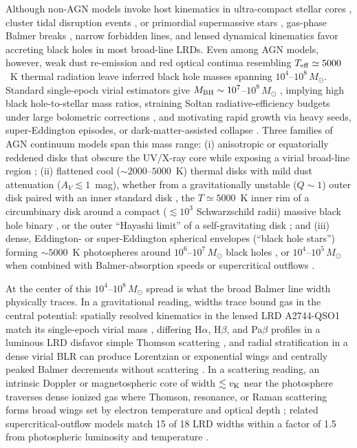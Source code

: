 \documentclass[twocolumn,linenumbers]{aastex701}
\newcommand{\Ha}{H$\alpha$}
\newcommand{\Hb}{H$\beta$}
\newcommand{\Teff}{T_{\rm eff}}
\newcommand{\vK}{v_{\rm K}}
\providecommand{\Msun}{M_\odot}
\begin{document}
Although non-AGN models invoke host kinematics in ultra-compact stellar cores \citep{Baggen2024}, cluster tidal disruption events \citep{Bellovary2025}, or primordial supermassive stars \citep{NandalLoeb2026}, gas-phase Balmer breaks \citep{deGraaffRuby2025,NaiduBHStar2026}, narrow forbidden lines, and lensed dynamical kinematics \citep{Juodzbalis2026} favor accreting black holes in most broad-line LRDs.
Even among AGN models, however, weak dust re-emission and red optical continua resembling $\Teff\simeq5000$~K thermal radiation \citep{InayoshiHo,deGraaff2026} leave inferred black hole masses spanning $10^{4}$--$10^{8}\,\Msun$.
Standard single-epoch virial estimators give $M_{\rm BH}\sim10^{7}$--$10^{8}\,\Msun$ \citep{Matthee2024,Taylor2025,Sun2026}, implying high black hole-to-stellar mass ratios, straining So{\l}tan radiative-efficiency budgets \citep{Soltan1982} under large bolometric corrections \citep{InayoshiIchikawa2024,Akins2025,Greene2026}, and motivating rapid growth via heavy seeds, super-Eddington episodes, or dark-matter-assisted collapse \citep{Inayoshi2025,Gu2026}.
Three families of AGN continuum models span this mass range: (i) anisotropic or equatorially reddened disks that obscure the UV/X-ray core while exposing a virial broad-line region \citep[BLR;][]{Madau2026a,Madau2026c}; (ii) flattened cool ($\sim2000$--$5000$~K) thermal disks with mild dust attenuation ($A_V\lesssim1$~mag), whether from a gravitationally unstable ($Q\sim1$) outer disk paired with an inner standard disk \citep{ZhangCX2026}, the $T\simeq5000$~K inner rim of a circumbinary disk around a compact ($\lesssim10^{3}$ Schwarzschild radii) massive black hole binary \citep{InayoshiChen2026}, or the outer ``Hayashi limit'' of a self-gravitating disk \citep{ChenYX2026}; and (iii) dense, Eddington- or super-Eddington spherical envelopes (``black hole stars'') forming $\sim5000$~K photospheres around $10^{6}$--$10^{7}\,\Msun$ black holes \citep{NaiduBHStar2026,LiuHP2025,BegelmanDexter2025,Kido2025,deGraaff2026}, or $10^{4}$--$10^{5}\,\Msun$ when combined with Balmer-absorption speeds or supercritical outflows \citep{Sun2026,Naidu2026,Curtis2026,LiuFengHo2026}.

At the center of this $10^{4}$--$10^{8}\,\Msun$ spread is what the broad Balmer line width physically traces.
In a gravitational reading, widths trace bound gas in the central potential: spatially resolved kinematics in the lensed LRD A2744-QSO1 match its single-epoch virial mass \citep{Juodzbalis2026}, differing \Ha{}, \Hb{}, and Pa$\beta$ profiles in a luminous LRD disfavor simple Thomson scattering \citep{Brazzini2025}, and radial stratification in a dense virial BLR can produce Lorentzian or exponential wings and centrally peaked Balmer decrements without scattering \citep{Madau2026b,Scholtz2026,ChenCH2026}.
In a scattering reading, an intrinsic Doppler or magnetospheric core of width $\lesssim\vK$ near the photosphere \citep{Lin2025,Inayoshi2026,Burke2025,TakasaoInayoshi2026} traverses dense ionized gas where Thomson, resonance, or Raman scattering forms broad wings set by electron temperature and optical depth \citep{Rusakov2026,Chang2025,Sneppen2026,Matthee2026}; related supercritical-outflow models match 15 of 18 LRD widths within a factor of 1.5 from photospheric luminosity and temperature \citep{LiuFengHo2026}.
\end{document}
